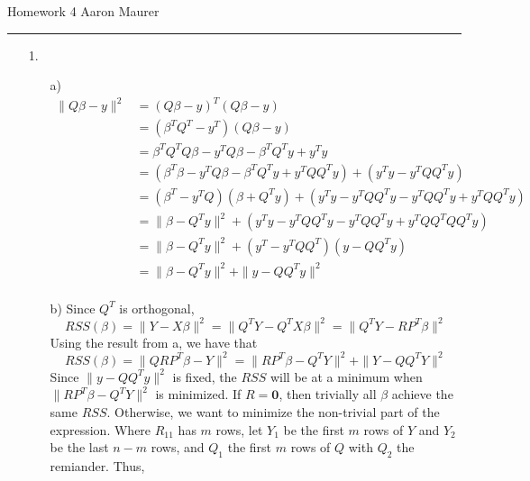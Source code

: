 \documentclass[11pt]{article}
\theoremstyle{definition}
\begin{document}
Homework 4 \hfill Aaron Maurer
\vspace{2mm}
\hrule
\vspace{2mm}
\begin{itemize}
    \item[1.]
        \begin{itemize}
            \item[a)]
                \begin{align*}
                    \|Q\beta - y\|^2 &= (Q\beta - y)^T(Q\beta - y) \\                
                                     &= (\beta^T Q^T - y^T)(Q\beta - y) \\
                                     &= \beta^TQ^TQ\beta - y^TQ\beta - \beta^T Q^T y + y^Ty  \\
                                     &= (\beta^T\beta - y^TQ\beta - \beta^T Q^T y + y^TQQ^Ty) + (y^Ty - y^TQQ^Ty) \\
                                     &= (\beta^T - y^TQ)(\beta + Q^Ty) + (y^Ty - y^TQQ^Ty- y^TQQ^Ty + y^TQQ^Ty) \\
                                     &= \|\beta - Q^Ty\|^2 + (y^Ty - y^TQQ^Ty- y^TQQ^Ty + y^TQQ^TQQ^Ty) \\
                                     &= \|\beta - Q^Ty\|^2 + (y^T - y^TQQ^T)(y - QQ^Ty)\\
                                     &= \|\beta - Q^Ty\|^2 + \|y - QQ^Ty\|^2\\
                \end{align*}
            \item[b)]
                Since $Q^T$ is orthogonal,
                \[RSS(\beta) = \|Y-X\beta\|^2 = \|Q^TY-Q^TX\beta\|^2 = \|Q^TY - RP^T\beta\|^2 \]
                Using the result from a, we have that
                \[RSS(\beta) = \|QRP^T\beta - Y\|^2 = \|RP^T\beta-Q^TY\|^2 + \|Y-QQ^TY\|^2 \]
                Since \(\|y-QQ^Ty\|^2\) is fixed, the $RSS$ will be at a minimum when \(\|RP^T\beta-Q^TY\|^2\) is minimized. If \(R=\mathbf{0}\), then trivially all \(\beta\) achieve the same $RSS$. Otherwise, we want to minimize the non-trivial part of the expression. Where $R_{11}$ has $m$ rows, let $Y_1$ be the first $m$ rows of $Y$ and $Y_2$ be the last $n-m$ rows, and $Q_1$ the first $m$ rows of $Q$ with $Q_2$ the remiander. Thus, 
                \begin{align*}

\end{align*}
\end{itemize}
\end{itemize}
\end{document}
